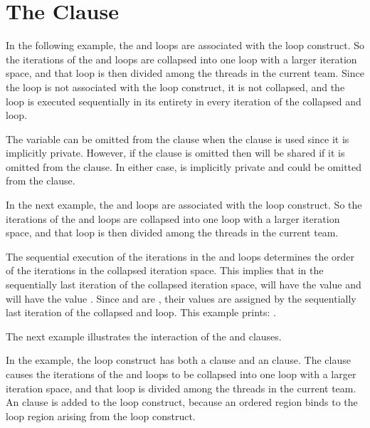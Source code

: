 \pagebreak
\chapter{The  Clause}
\label{chap:collapse}

In the following example, the  and  loops are associated with 
the loop construct. So the iterations of the  and  loops are 
collapsed into one loop with a larger iteration space, and that loop is then divided 
among the threads in the current team. Since the  loop is not associated 
with the loop construct, it is not collapsed, and the  loop is executed 
sequentially in its entirety in every iteration of the collapsed  and 
 loop. 

The variable  can be omitted from the   clause when the 
 clause is used since it is implicitly private. However, if the 
 clause is omitted then  will be shared if it is omitted 
from the  clause. In either case,  is implicitly private 
and could be omitted from the   clause.



In the next example, the  and  loops are associated with the 
loop construct. So the iterations of the  and  loops are collapsed 
into one loop with a larger iteration space, and that loop is then divided among 
the threads in the current team.

The sequential execution of the iterations in the  and  loops 
determines the order of the iterations in the collapsed iteration space. This implies 
that in the sequentially last iteration of the collapsed iteration space,  
will have the value  and  will have the value . Since 
 and  are , their values are assigned 
by the sequentially last iteration of the collapsed  and  loop. 
This example prints: .



The next example illustrates the interaction of the  and  
 clauses.

In the example, the loop construct has both a  clause and an  
clause. The  clause causes the iterations of the  and 
 loops to be collapsed into one loop with a larger iteration space, and 
that loop is divided among the threads in the current team. An  
clause is added to the loop construct, because an ordered region binds to the loop 
region arising from the loop construct.

